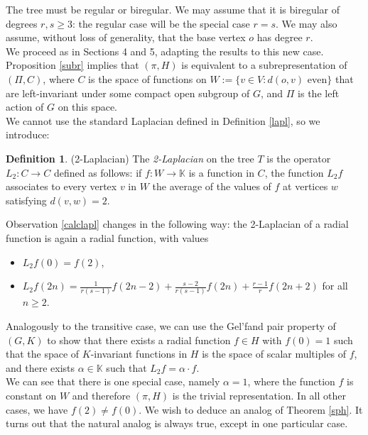 \documentclass{article}
\theoremstyle{definition}
\newtheorem{dfn}{Definition}[section]
\theoremstyle{remark}
\theoremstyle{plain}
\begin{document}
The tree must be regular or biregular. We may assume that it is biregular of degrees $r,s\geq 3$: the regular case will be the special case $r=s$. We may also assume, without loss of generality, that the base vertex $o$ has degree $r$. \\

We proceed as in Sections 4 and 5, adapting the results to this new case. \\

Proposition \ref{subr} implies that $(\pi,H)$ is equivalent to a subrepresentation of $(\Pi,C)$, where $C$ is the space of functions on $W:=\{v\in V: d(o,v)\text{ even}\}$ that are left-invariant under some compact open subgroup of $G$, and $\Pi$ is the left action of $G$ on this space. \\

We cannot use the standard Laplacian defined in Definition \ref{lapl}, so we introduce:

\begin{dfn}{(2-Laplacian)}
The \textit{2-Laplacian} on the tree $T$ is the operator $L_2: C\rightarrow C$ defined as follows: if $f: W\rightarrow\mathbb{K}$ is a function in $C$, the function $L_2 f$ associates to every vertex $v$ in $W$ the average of the values of $f$ at vertices $w$ satisfying $d(v,w)=2$. \\
\end{dfn}

Observation \ref{calclapl} changes in the following way: the 2-Laplacian of a radial function is again a radial function, with values
\begin{itemize}
    \item $L_2 f(0)=f(2)$,
    \item $L_2 f(2n)=\frac{1}{r(s-1)}f(2n-2)+\frac{s-2}{r(s-1)}f(2n)+\frac{r-1}{r}f(2n+2)$ for all $n\geq 2$. \\
\end{itemize}

Analogously to the transitive case, we can use the Gel'fand pair property of $(G,K)$ to show that there exists a radial function $f\in H$ with $f(0)=1$ such that the space of $K$-invariant functions in $H$ is the space of scalar multiples of $f$, and there exists $\alpha\in\mathbb{K}$ such that $L_2 f=\alpha\cdot f$. \\

We can see that there is one special case, namely $\alpha=1$, where the function $f$ is constant on $W$ and therefore $(\pi,H)$ is the trivial representation. In all other cases, we have $f(2)\neq f(0)$. We wish to deduce an analog of Theorem \ref{sph}. It turns out that the natural analog is always true, except in one particular case. \\
\end{document}
